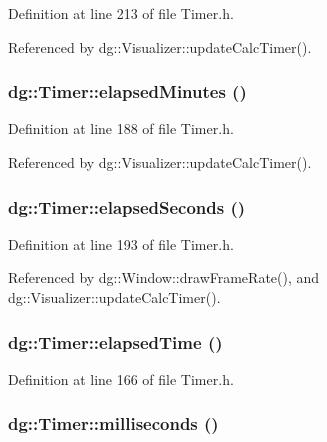 Definition at line 213 of file Timer.h.

Referenced by dg::Visualizer::update\-Calc\-Timer().
\subsubsection{ dg::Timer::elapsed\-Minutes ()\hspace{0.3cm}{\tt  [inline]}}\label{classdg_1_1Timer_a11}




Definition at line 188 of file Timer.h.

Referenced by dg::Visualizer::update\-Calc\-Timer().
\subsubsection{ dg::Timer::elapsed\-Seconds ()\hspace{0.3cm}{\tt  [inline]}}\label{classdg_1_1Timer_a12}




Definition at line 193 of file Timer.h.

Referenced by dg::Window::draw\-Frame\-Rate(), and dg::Visualizer::update\-Calc\-Timer().
\subsubsection{ dg::Timer::elapsed\-Time ()\hspace{0.3cm}{\tt  [inline]}}\label{classdg_1_1Timer_a8}




Definition at line 166 of file Timer.h.
\subsubsection{ dg::Timer::milliseconds ()\hspace{0.3cm}{\tt  [inline]}}\label{classdg_1_1Timer_a15}




